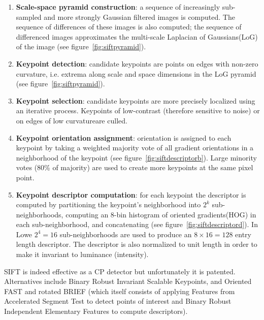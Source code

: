 \begin{framed}
	\begin{enumerate}
		\item \textbf{Scale-space pyramid construction}: a sequence of increasingly sub-sampled and more strongly Gaussian filtered images is computed. The sequence of differences of these images is also computed; the sequence of differenced images approximates the multi-scale Laplacian of Gaussians\footnotemark (LoG) of the image (see figure~\ref{fig:siftpyramid}).
		\item \textbf{Keypoint detection}: candidate keypoints are points on edges with non-zero curvature, i.e. extrema along scale and space dimensions in the LoG pyramid (see figure~\ref{fig:siftpyramid}).
		\item \textbf{Keypoint selection}: candidate keypoints are more precisely localized using an iterative process. Keypoints of low-contrast (therefore sensitive to noise) or on edges of low curvature\footnotemark are culled.
		\item \textbf{Keypoint orientation assignment}: orientation is assigned to each keypoint by taking a weighted majority vote of all gradient orientations in a neighborhood of the keypoint (see figure~\ref{fig:siftdescriptorb}). Large minority votes (80\% of majority) are used to create more keypoints at the same pixel point.
		\item \textbf{Keypoint descriptor computation}: for each keypoint the descriptor is computed by partitioning the keypoint's neighborhood into \(2^k\) sub-neighborhoods, computing an 8-bin histogram of oriented gradients\footnotemark (HOG) in each sub-neighborhood, and concatenating (see figure~\ref{fig:siftdescriptord}). In Lowe \etal\cite{lowe2004distinctive} \(2^4=16\) sub-neighborhoods are used to produce an \(8\times16 = 128\) entry length descriptor. The descriptor is also normalized to unit length in order to make it invariant to luminance (intensity).
	\end{enumerate}
\end{framed}
\addtocounter{footnote}{-3}
{
	\makeatletter
	\renewcommand\@makefnmark{\hbox{\@textsuperscript{\normalfont\color{white}\@thefnmark}}}
	\renewcommand\@makefntext[1]{%
	  \parindent 1em\noindent
				\hb@xt@1.8em{%
					\hss\@textsuperscript{\normalfont\@thefnmark}}#1}
	\makeatother

}

SIFT is indeed effective as a CP detector but unfortunately it is patented.
%
Alternatives include Binary Robust Invariant Scalable Keypoints\cite{leutenegger2011brisk}, and Oriented FAST and rotated BRIEF\cite{rublee2011orb} (which itself consists of applying Features from Accelerated Segment Test\cite{rosten2006machine} to detect points of interest and Binary Robust Independent Elementary Features\cite{calonder2010brief} to compute descriptors).

